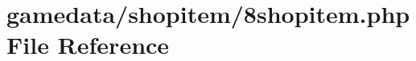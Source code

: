 \hypertarget{8shopitem_8php}{\section{gamedata/shopitem/8shopitem.php File Reference}
\label{8shopitem_8php}
}
